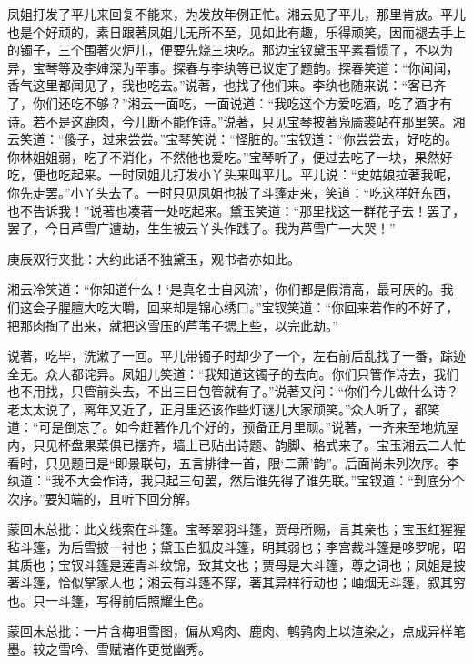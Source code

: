 \begin{parag}
    凤姐打发了平儿来回复不能来，为发放年例正忙。湘云见了平儿，那里肯放。平儿也是个好顽的，素日跟著凤姐儿无所不至，见如此有趣，乐得顽笑，因而褪去手上的镯子，三个围著火炉儿，便要先烧三块吃。那边宝钗黛玉平素看惯了，不以为异，宝琴等及李婶深为罕事。探春与李纨等已议定了题韵。探春笑道：“你闻闻，香气这里都闻见了，我也吃去。”说著，也找了他们来。李纨也随来说：“客已齐了，你们还吃不够？”湘云一面吃，一面说道：“我吃这个方爱吃酒，吃了酒才有诗。若不是这鹿肉，今儿断不能作诗。”说著，只见宝琴披著凫靥裘站在那里笑。湘云笑道：“傻子，过来尝尝。”宝琴笑说：“怪脏的。”宝钗道：“你尝尝去，好吃的。你林姐姐弱，吃了不消化，不然他也爱吃。”宝琴听了，便过去吃了一块，果然好吃，便也吃起来。一时凤姐儿打发小丫头来叫平儿。平儿说：“史姑娘拉著我呢，你先走罢。”小丫头去了。一时只见凤姐也披了斗篷走来，笑道：“吃这样好东西，也不告诉我！”说著也凑著一处吃起来。黛玉笑道：“那里找这一群花子去！罢了，罢了，今日芦雪广遭劫，生生被云丫头作践了。我为芦雪广一大哭！”\begin{note}庚辰双行夹批：大约此话不独黛玉，观书者亦如此。\end{note}湘云冷笑道：“你知道什么！‘是真名士自风流’，你们都是假清高，最可厌的。我们这会子腥膻大吃大嚼，回来却是锦心绣口。”宝钗笑道：“你回来若作的不好了，把那肉掏了出来，就把这雪压的芦苇子揌上些，以完此劫。”
\end{parag}


\begin{parag}
    说著，吃毕，洗漱了一回。平儿带镯子时却少了一个，左右前后乱找了一番，踪迹全无。众人都诧异。凤姐儿笑道：“我知道这镯子的去向。你们只管作诗去，我们也不用找，只管前头去，不出三日包管就有了。”说著又问：“你们今儿做什么诗？老太太说了，离年又近了，正月里还该作些灯谜儿大家顽笑。”众人听了，都笑道：“可是倒忘了。如今赶著作几个好的，预备正月里顽。”说著，一齐来至地炕屋内，只见杯盘果菜俱已摆齐，墙上已贴出诗题、韵脚、格式来了。宝玉湘云二人忙看时，只见题目是“即景联句，五言排律一首，限‘二萧’韵”。后面尚未列次序。李纨道：“我不大会作诗，我只起三句罢，然后谁先得了谁先联。”宝钗道：“到底分个次序。”要知端的，且听下回分解。
\end{parag}


\begin{parag}
    \begin{note}蒙回末总批：此文线索在斗篷。宝琴翠羽斗篷，贾母所赐，言其亲也；宝玉红猩猩毡斗篷，为后雪披一衬也；黛玉白狐皮斗篷，明其弱也；李宫裁斗篷是哆罗呢，昭其质也；宝钗斗篷是莲青斗纹锦，致其文也；贾母是大斗篷，尊之词也；凤姐是披著斗篷，恰似掌家人也；湘云有斗篷不穿，著其异样行动也；岫烟无斗篷，叙其穷也。只一斗篷，写得前后照耀生色。\end{note}
\end{parag}


\begin{parag}
    \begin{note}蒙回末总批：一片含梅咀雪图，偏从鸡肉、鹿肉、鹌鹑肉上以渲染之，点成异样笔墨。较之雪吟、雪赋诸作更觉幽秀。\end{note}
\end{parag}

